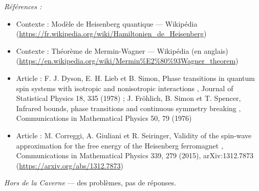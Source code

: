 \documentclass[11pt]{article}
\newenvironment{refs}{\par\small\noindent\emph{Références :}\begin{itemize}\setlength\itemsep{0pt}}{\end{itemize}\normalsize}
\begin{document}
\begin{refs}
\item Contexte : Modèle de Heisenberg quantique --- Wikipédia (\url{https://fr.wikipedia.org/wiki/Hamiltonien_de_Heisenberg})
\item Contexte : Théorème de Mermin-Wagner --- Wikipédia (en anglais) (\url{https://en.wikipedia.org/wiki/Mermin%E2%80%93Wagner_theorem})
\item Article : F. J. Dyson, E. H. Lieb et B. Simon, \og{} Phase transitions in quantum spin systems with isotropic and nonisotropic interactions \fg{}, Journal of Statistical Physics 18, 335 (1978) ; J. Fröhlich, B. Simon et T. Spencer, \og{} Infrared bounds, phase transitions and continuous symmetry breaking \fg{}, Communications in Mathematical Physics 50, 79 (1976)
\item Article : M. Correggi, A. Giuliani et R. Seiringer, \og{} Validity of the spin-wave approximation for the free energy of the Heisenberg ferromagnet \fg{}, Communications in Mathematical Physics 339, 279 (2015), arXiv:1312.7873 (\url{https://arxiv.org/abs/1312.7873})
\end{refs}

\bigskip


\vfill
\noindent\emph{Hors de la Caverne} --- des probl\`emes, pas de r\'eponses.
\end{document}
